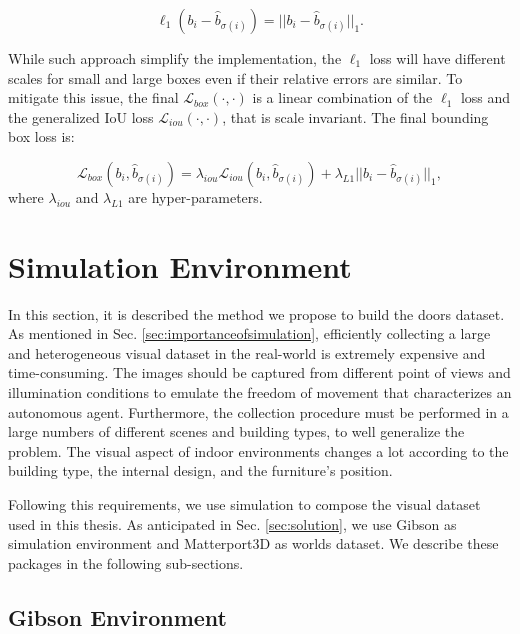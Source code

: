 \begin{equation}
\ell_1(b_i - \hat b_{\sigma(i)}) = ||b_i - \hat b_{\sigma(i)}||_1.
\end{equation}

While such approach simplify the implementation, the $\ell_1$ loss will have different scales for small and large boxes even if their relative errors are similar. To mitigate this issue, the final $\mathcal{L}_{box}(\cdot, \cdot)$ is a linear combination of the $\ell_1$ loss and the generalized IoU loss \cite{generalizediou} $\mathcal{L}_{iou}(\cdot, \cdot)$, that is scale invariant. The final bounding box loss is:

\begin{equation}
\mathcal{L}_{box}(b_i, \hat b_{\sigma(i)}) = \lambda_{iou}\mathcal{L}_{iou}(b_i, \hat b_{\sigma(i)}) + \lambda_{L1}||b_i - \hat b_{\sigma(i)}||_1,
\end{equation}
where $\lambda_{iou}$ and $\lambda_{L1}$ are hyper-parameters.

\section{Simulation Environment}

In this section, it is described the method we propose to build the doors dataset. As mentioned in Sec. \ref{sec:importanceofsimulation}, efficiently collecting a large and heterogeneous visual dataset in the real-world is extremely expensive and time-consuming. The images should be captured from different point of views and illumination conditions to emulate the freedom of movement that characterizes an autonomous agent. Furthermore, the collection procedure must be performed in a large numbers of different scenes and building types, to well generalize the problem. The visual aspect of indoor environments changes a lot according to the building type, the internal design, and the furniture's position.

Following this requirements, we use simulation to compose the visual dataset used in this thesis. As anticipated in Sec. \ref{sec:solution}, we use Gibson \cite{gibson} as simulation environment and Matterport3D \cite{matterport} as worlds dataset. We describe these packages in the following sub-sections.

\subsection{Gibson Environment}

